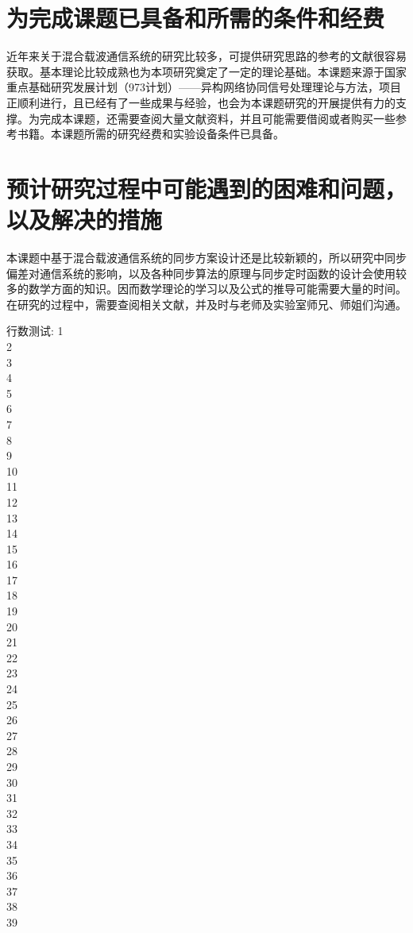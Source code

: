 \section{为完成课题已具备和所需的条件和经费}
近年来关于混合载波通信系统的研究比较多，可提供研究思路的参考的文献很容易获取。基本理论比较成熟也为本项研究奠定了一定的理论基础。本课题来源于国家重点基础研究发展计划（973计划）——异构网络协同信号处理理论与方法，项目正顺利进行，且已经有了一些成果与经验，也会为本课题研究的开展提供有力的支撑。为完成本课题，还需要查阅大量文献资料，并且可能需要借阅或者购买一些参考书籍。本课题所需的研究经费和实验设备条件已具备。


\section{预计研究过程中可能遇到的困难和问题，以及解决的措施}
本课题中基于混合载波通信系统的同步方案设计还是比较新颖的，所以研究中同步偏差对通信系统的影响，以及各种同步算法的原理与同步定时函数的设计会使用较多的数学方面的知识。因而数学理论的学习以及公式的推导可能需要大量的时间。在研究的过程中，需要查阅相关文献，并及时与老师及实验室师兄、师姐们沟通。

\clearpage
行数测试: 1\\
2\\
3\\
4\\
5\\
6\\
7\\
8\\
9\\
10\\
11\\
12\\
13\\
14\\
15\\
16\\
17\\
18\\
19\\
20\\
21\\
22\\
23\\
24\\
25\\
26\\
27\\
28\\
29\\
30\\
31\\
32\\
33\\
34\\
35\\
36\\
37\\
38\\
39\\
